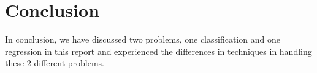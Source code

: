 \section{Conclusion}
In conclusion, we have discussed two problems, one classification and one regression in this report and experienced the differences in techniques in handling these 2 different problems.
